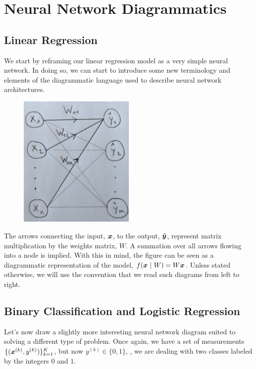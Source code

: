 \section{Neural Network Diagrammatics}
\label{section:neural-network-diagrammatics}
%
%
\subsection{Linear Regression}
%
%
We start by reframing our linear regression model as a very simple neural network.
In doing so, we can start to introduce some new terminology and elements of the diagrammatic language used to describe neural network architectures.
%
\begin{figure}[H]
    \centering
    \includegraphics[width=0.5\textwidth]{../figures/chapter_01/nn_diagram_linear_regression.png}
\end{figure}
%

The arrows connecting the input, $\bm{x}$, to the output, $\hat{\bm{y}}$, represent matrix multiplication by the weights matrix, $W$.
A summation over all arrows flowing into a node is implied.
With this in mind, the figure can be seen as a diagrammatic representation of the model, $f(\bm{x} ~|~ W) = W \bm{x}$.
Unless stated otherwise, we will use the convention that we read such diagrams from left to right.

%
%
\subsection{Binary Classification and Logistic Regression}
%
%
Let's now draw a slightly more interesting neural network diagram suited to solving a different type of problem.
Once again, we have a set of measurements $\{(\bm{x}^{(k)}, y^{(k)})\}_{k=1}^K$, but now $y^{(k)} \in \{0, 1\}$, \ie, we are dealing with two classes labeled by the integers $0$ and $1$.

